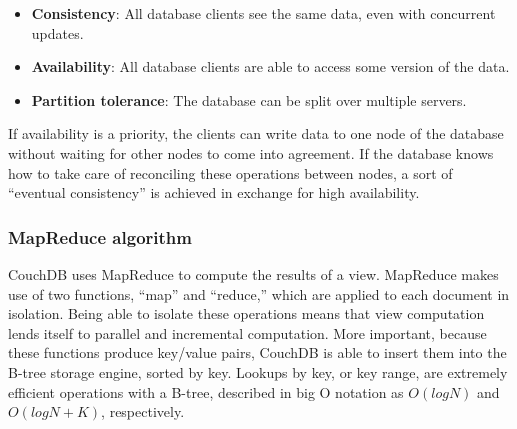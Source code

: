 \begin{itemize}
    \item \textbf{Consistency}: All database clients see the same data, even with concurrent updates.
    \item \textbf{Availability}: All database clients are able to access some version of the data.
    \item \textbf{Partition tolerance}: The database can be split over multiple servers.
\end{itemize}

If availability is a priority, the clients can write data to one node of the 
database without waiting for other nodes to come into agreement. If the database 
knows how to take care of reconciling these operations between nodes, 
a sort of “eventual consistency” is achieved in exchange for high availability.

\subsubsection{MapReduce algorithm}

CouchDB uses MapReduce to compute the results of a view. MapReduce makes use of two 
functions, “map” and “reduce,” which are applied to each document in isolation. 
Being able to isolate these operations means that view computation lends itself 
to parallel and incremental computation. More important, because these functions 
produce key/value pairs, CouchDB is able to insert them into the B-tree storage engine, 
sorted by key. Lookups by key, or key range, are extremely efficient operations with a 
B-tree, described in big O notation as $O(log N)$ and $O(log N + K)$, respectively.~\cite{CouchDB}
